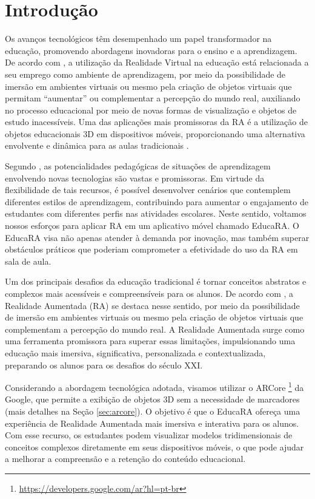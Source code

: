 \documentclass[12pt]{article}
\begin{document}
\section{Introdução}

Os avanços tecnológicos têm desempenhado um papel transformador na educação, promovendo abordagens inovadoras para o ensino e a aprendizagem. De acordo com \cite{de2019realidade}, a utilização da Realidade Virtual na educação está relacionada a seu emprego como ambiente de aprendizagem, por meio da possibilidade de imersão em ambientes virtuais ou mesmo pela criação de objetos virtuais que permitam “aumentar” ou complementar a percepção do mundo real, auxiliando no processo educacional por meio de novas formas de visualização e objetos de estudo inacessíveis. Uma das aplicações mais promissoras da RA é a utilização de objetos educacionais 3D em dispositivos móveis, proporcionando uma alternativa envolvente e dinâmica para as aulas tradicionais \cite{dos2024gamificaccao}.

Segundo \cite{rezende2021realidade}, as potencialidades pedagógicas de situações de aprendizagem envolvendo novas tecnologias são vastas e promissoras. Em virtude da flexibilidade de tais recursos, é possível desenvolver cenários que contemplem diferentes estilos de aprendizagem, contribuindo para aumentar o engajamento de estudantes com diferentes perfis nas atividades escolares. Neste sentido, voltamos nossos esforços para aplicar RA em um aplicativo móvel chamado EducaRA. O EducaRA visa não apenas atender à demanda por inovação, mas também superar obstáculos práticos que poderiam comprometer a efetividade do uso da RA em sala de aula. 

Um dos principais desafios da educação tradicional é tornar conceitos abstratos e complexos mais acessíveis e compreensíveis para os alunos. De acordo com \cite{de2019realidade}, a Realidade Aumentada (RA) se destaca nesse sentido, por meio da possibilidade de imersão em ambientes virtuais ou mesmo pela criação de objetos virtuais que complementam a percepção do mundo real. A Realidade Aumentada surge como uma ferramenta promissora para superar essas limitações, impulsionando uma educação mais imersiva, significativa, personalizada e contextualizada, preparando os alunos para os desafios do século XXI.

Considerando a abordagem tecnológica adotada, visamos utilizar o ARCore \footnote{\href{https://developers.google.com/ar?hl=pt-br}{https://developers.google.com/ar?hl=pt-br}} da Google, que permite a exibição de objetos 3D sem a necessidade de marcadores (mais detalhes na Seção \ref{sec:arcore}). O objetivo é que o EducaRA ofereça uma experiência de Realidade Aumentada mais imersiva e interativa para os alunos. Com esse recurso, os estudantes podem visualizar modelos tridimensionais de conceitos complexos diretamente em seus dispositivos móveis, o que pode ajudar a melhorar a compreensão e a retenção do conteúdo educacional.
\end{document}

